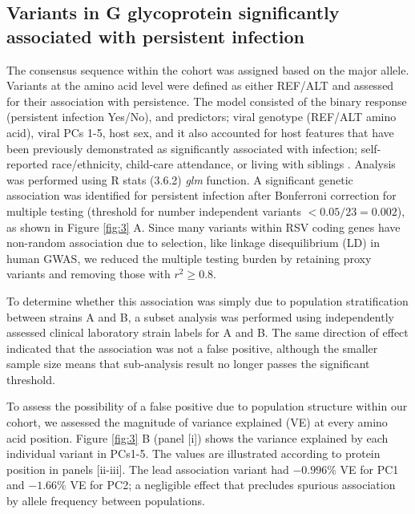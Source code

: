 \documentclass{article}
\begin{document}
\subsection{Variants in G glycoprotein significantly associated with persistent infection}
The consensus sequence within the cohort was assigned based on the major allele.
Variants at the amino acid level were defined as either REF/ALT and assessed for their association with persistence.
The model consisted of
the binary response (persistent infection Yes/No),
and predictors; viral genotype (REF/ALT amino acid), viral PCs 1-5, host sex, and it also accounted for host features that have been previously demonstrated as significantly associated with infection;
self-reported race/ethnicity, child-care attendance, or living with siblings
\cite{hall1976respiratory}.
Analysis was performed using R stats (3.6.2) \textit{glm} function. 
A significant genetic association was identified for persistent infection after Bonferroni correction for multiple testing (threshold for number independent variants $<0.05/23=0.002$), 
as shown in 
Figure \ref{fig:3} A. 
Since many variants within RSV coding genes have non-random association due to selection, like linkage disequilibrium (LD) in human GWAS, 
we reduced the multiple testing burden by retaining proxy variants and removing those with
$r^2 \ge 0.8$.

To determine whether this association was simply due to population stratification between strains A and B, a subset analysis was performed using independently assessed clinical laboratory strain labels for A and B.
The same direction of effect indicated that the association was not a false positive, although the smaller sample size means that sub-analysis result no longer passes the significant threshold. 

To assess the possibility of a false positive due to population structure within our cohort,
we assessed the magnitude of variance explained (VE) at every amino acid position.
Figure \ref{fig:3} B (panel [i]) shows the variance explained by each individual variant in PCs1-5.
The values are illustrated according to protein position in panels [ii-iii].
The lead association variant had 
$-0.996\%$ VE for PC1 and $-1.66\%$ VE for PC2; 
a negligible effect that precludes spurious association by allele frequency between populations.
\end{document}

